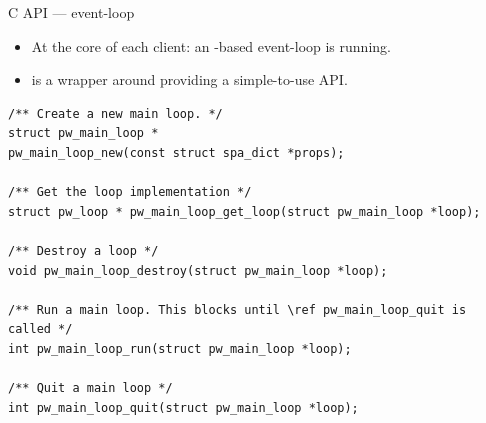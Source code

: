 \begin{frame}[fragile]{C API — event-loop}
  \begin{itemize}
  \item At the core of each client: an -based event-loop
    is running.
  \item {} is a wrapper around 
    providing a simple-to-use API.
  \end{itemize}

      \begin{block}{}
        \fontsize{9}{9}\selectfont
          \begin{verbatim}
/** Create a new main loop. */
struct pw_main_loop *
pw_main_loop_new(const struct spa_dict *props);

/** Get the loop implementation */
struct pw_loop * pw_main_loop_get_loop(struct pw_main_loop *loop);

/** Destroy a loop */
void pw_main_loop_destroy(struct pw_main_loop *loop);

/** Run a main loop. This blocks until \ref pw_main_loop_quit is called */
int pw_main_loop_run(struct pw_main_loop *loop);

/** Quit a main loop */
int pw_main_loop_quit(struct pw_main_loop *loop);
          \end{verbatim}
      \end{block}
\end{frame}



